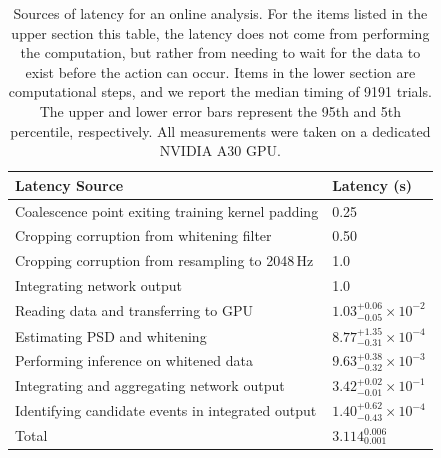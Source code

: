 \begin{refsection}
\begin{table}
\centering
\setlength\tabcolsep{8pt}
\begin{tabular*}{\columnwidth}{ p{10cm} p{3.5cm} }
\hline
\hline
Latency Source & Latency (s)\\
\hline
Coalescence point exiting training kernel padding & 0.25\\
Cropping corruption from whitening filter & 0.50\\
Cropping corruption from resampling to 2048\,Hz & 1.0\\
Integrating network output & 1.0\\
\hline
Reading data and transferring to GPU & $1.03^{+0.06}_{-0.05} \times 10^{-2}$\\
Estimating PSD and whitening & $8.77^{+1.35}_{-0.31} \times 10^{-4}$\\
Performing inference on whitened data & $9.63^{+0.38}_{-0.32} \times 10^{-3}$\\
Integrating and aggregating network output & $3.42^{+0.02}_{-0.01} \times 10^{-1}$\\
Identifying candidate events in integrated output & $1.40^{+0.62}_{-0.43} \times 10^{-4}$\\
\hline

Total & $3.114^{0.006}_{0.001}$\\
\hline
\hline
\end{tabular*}
\caption[Sources of latency for an \aframe online analysis]{Sources of latency for an \aframe online analysis. 
For the items listed in the upper section this table, the latency does not come from performing the computation, but rather from needing to wait for the data to exist before the action can occur. 
Items in the lower section are computational steps, and we report the median timing of 9191 trials. 
The upper and lower error bars represent the 95th and 5th percentile, respectively. 
All measurements were taken on a dedicated NVIDIA A30 GPU.}
\label{aframe_meth_tab:latency}
\end{table}



\end{refsection}
